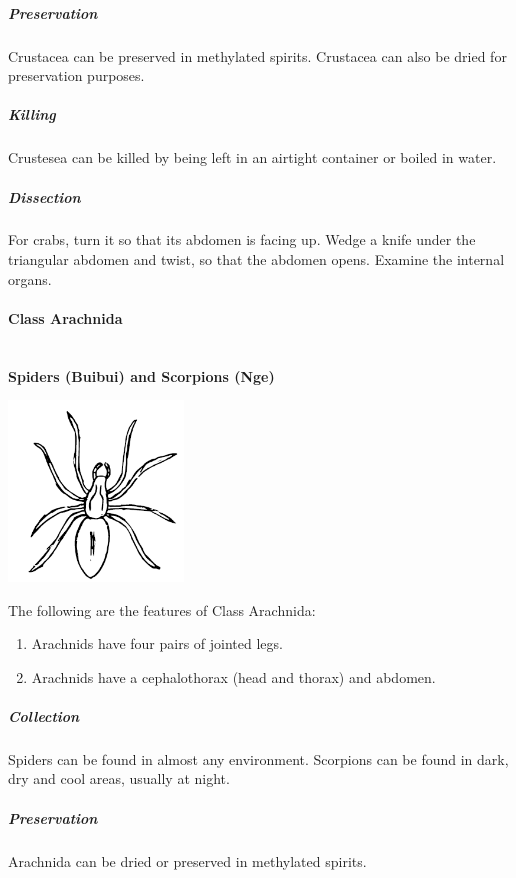 \begin{multicols}{2}
\subparagraph{Preservation} 
Crustacea can be preserved in methylated spirits. Crustacea can also be dried for preservation purposes.

\subparagraph{Killing}
Crustesea can be killed by being left in an airtight container or boiled in water.

\subparagraph{Dissection}
For crabs, turn it so that its abdomen is facing up. Wedge a knife under the triangular abdomen and twist, so that the abdomen opens. Examine the internal organs.
		
\paragraph{Class Arachnida} \hfill \\
\textbf{Spiders (Buibui) and Scorpions (Nge)}

\begin{center}
\includegraphics[width=0.35\textwidth]{./img/spider.png}
\end{center}

The following are the features of Class Arachnida:
\begin{enumerate}
\item{Arachnids have four pairs of jointed legs.}
\item{Arachnids have a cephalothorax (head and thorax) and abdomen.}
\end{enumerate}

%

\subparagraph{Collection}
Spiders can be found in almost any environment. Scorpions can be found in dark, dry and cool areas, usually at night.

\subparagraph{Preservation} 
Arachnida can be dried or preserved in methylated spirits.


\end{multicols}
